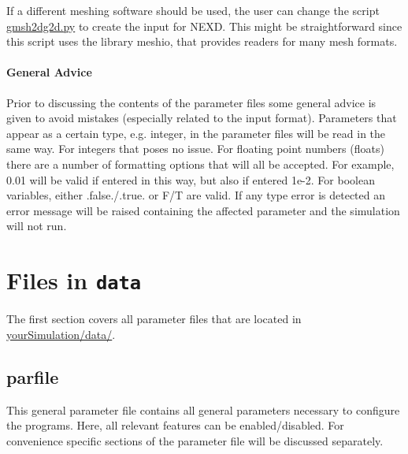 If a different meshing software should be used, the user can change the script \url{gmsh2dg2d.py} to create the input for NEXD. This might be straightforward since this script uses the library meshio, that provides readers for many mesh formats.

	\paragraph*{General Advice}
		Prior to discussing the contents of the parameter files some general advice is given to avoid mistakes (especially related to the input format). Parameters that appear as a certain type, e.g. integer, in the parameter files will be read in the same way. For integers that poses no issue. For floating point numbers (floats) there are a number of formatting options that will all be accepted. For example, 0.01 will be valid if entered in this way, but also if entered 1e-2. For boolean variables, either .false./.true. or F/T are valid. If any type error is detected an error message will be raised containing the affected parameter and the simulation will not run.
		
	\section{Files in \texttt{data}}
		The first section covers all parameter files that are located in \url{yourSimulation/data/}.
		
	\subsection{parfile}
	\label{subsec:parfile}
		This general parameter file contains all general parameters necessary to configure the programs. Here, all relevant features can be enabled/disabled. For convenience specific sections of the parameter file will be discussed separately.
